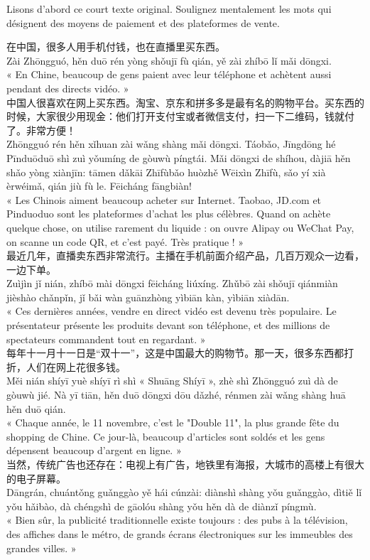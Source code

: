 \documentclass[11pt]{article}
\newcounter{popsec}
\newcounter{popsub}
\newcommand{\courssub}[1]{%
  \stepcounter{popsub}%
  \par\vspace{9pt}\noindent{\popxbold\fontsize{11.5}{13}\selectfont\color{popink}{\color{poporange}\thepopsec.\thepopsub}\hspace{6pt}#1}\par\nopagebreak\vspace{4pt}
}
\begin{document}
\courssub{Observation : un texte pour découvrir}

Lisons d'abord ce court texte original. Soulignez mentalement les mots qui désignent des moyens de paiement et des plateformes de vente.

\begin{textebox}
在中国，很多人用手机付钱，也在直播里买东西。\\
Zài Zhōngguó, hěn duō rén yòng shǒujī fù qián, yě zài zhíbō lǐ mǎi dōngxi.\\
« En Chine, beaucoup de gens paient avec leur téléphone et achètent aussi pendant des directs vidéo. »\\[0.4em]
中国人很喜欢在网上买东西。淘宝、京东和拼多多是最有名的购物平台。买东西的时候，大家很少用现金：他们打开支付宝或者微信支付，扫一下二维码，钱就付了。非常方便！\\
Zhōngguó rén hěn xǐhuan zài wǎng shàng mǎi dōngxi. Táobǎo, Jīngdōng hé Pīnduōduō shì zuì yǒumíng de gòuwù píngtái. Mǎi dōngxi de shíhou, dàjiā hěn shǎo yòng xiànjīn: tāmen dǎkāi Zhīfùbǎo huòzhě Wēixìn Zhīfù, sǎo yí xià èrwéimǎ, qián jiù fù le. Fēicháng fāngbiàn!\\
« Les Chinois aiment beaucoup acheter sur Internet. Taobao, JD.com et Pinduoduo sont les plateformes d'achat les plus célèbres. Quand on achète quelque chose, on utilise rarement du liquide : on ouvre Alipay ou WeChat Pay, on scanne un code QR, et c'est payé. Très pratique ! »\\[0.4em]
最近几年，直播卖东西非常流行。主播在手机前面介绍产品，几百万观众一边看，一边下单。\\
Zuìjìn jǐ nián, zhíbō mài dōngxi fēicháng liúxíng. Zhǔbō zài shǒujī qiánmiàn jièshào chǎnpǐn, jǐ bǎi wàn guānzhòng yìbiān kàn, yìbiān xiàdān.\\
« Ces dernières années, vendre en direct vidéo est devenu très populaire. Le présentateur présente les produits devant son téléphone, et des millions de spectateurs commandent tout en regardant. »\\[0.4em]
每年十一月十一日是“双十一”，这是中国最大的购物节。那一天，很多东西都打折，人们在网上花很多钱。\\
Měi nián shíyī yuè shíyī rì shì « Shuāng Shíyī », zhè shì Zhōngguó zuì dà de gòuwù jié. Nà yī tiān, hěn duō dōngxi dōu dǎzhé, rénmen zài wǎng shàng huā hěn duō qián.\\
« Chaque année, le 11 novembre, c'est le "Double 11", la plus grande fête du shopping de Chine. Ce jour-là, beaucoup d'articles sont soldés et les gens dépensent beaucoup d'argent en ligne. »\\[0.4em]
当然，传统广告也还存在：电视上有广告，地铁里有海报，大城市的高楼上有很大的电子屏幕。\\
Dāngrán, chuántǒng guǎnggào yě hái cúnzài: diànshì shàng yǒu guǎnggào, dìtiě lǐ yǒu hǎibào, dà chéngshì de gāolóu shàng yǒu hěn dà de diànzǐ píngmù.\\
« Bien sûr, la publicité traditionnelle existe toujours : des pubs à la télévision, des affiches dans le métro, de grands écrans électroniques sur les immeubles des grandes villes. »
\end{textebox}
\end{document}
